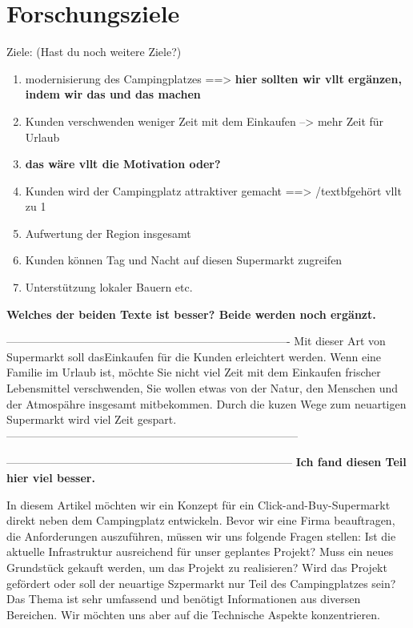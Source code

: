 \section{Forschungsziele}

Ziele: (Hast du noch weitere Ziele?)
\begin{enumerate}
    \item modernisierung des Campingplatzes ==> \textbf{hier sollten wir vllt ergänzen, indem wir das und das machen}
    \item Kunden verschwenden weniger Zeit mit dem Einkaufen --> mehr Zeit für Urlaub 
    \item \textbf{das wäre vllt die Motivation oder?}
    \item Kunden wird der Campingplatz attraktiver gemacht ==> /textbf{gehört vllt zu 1}
    \item Aufwertung der Region insgesamt
    \item Kunden können Tag und Nacht auf diesen Supermarkt zugreifen
    \item Unterstützung lokaler Bauern etc.
\end{enumerate}



\textbf{Welches der beiden Texte ist besser? Beide werden noch ergänzt.}

----------------------------------------------------------------------------
Mit dieser Art von Supermarkt soll dasEinkaufen für die Kunden erleichtert werden. 
Wenn eine Familie im Urlaub ist, möchte Sie nicht viel Zeit mit dem Einkaufen frischer 
Lebensmittel verschwenden, Sie wollen etwas von der Natur, den Menschen und der Atmospähre 
insgesamt mitbekommen. Durch die kuzen Wege zum neuartigen Supermarkt wird viel Zeit gespart.
------------------------------------------------------------------------------



-----------------------------------------------------------------------------
\textbf{Ich fand diesen Teil hier viel besser.}


In diesem Artikel möchten wir ein Konzept für ein Click-and-Buy-Supermarkt direkt neben dem Campingplatz entwickeln. 
Bevor wir eine Firma beauftragen, die Anforderungen auszuführen, müssen wir uns folgende Fragen stellen: Ist die
aktuelle Infrastruktur ausreichend für unser  geplantes Projekt? Muss ein neues Grundstück gekauft werden, um das 
Projekt zu realisieren? Wird das Projekt gefördert oder soll der neuartige Szpermarkt nur Teil des Campingplatzes sein?
Das Thema ist sehr umfassend und benötigt Informationen aus  diversen Bereichen. Wir möchten uns aber auf die 
Technische Aspekte konzentrieren.


